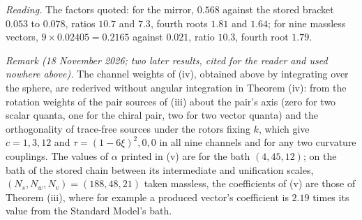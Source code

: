 \emph{Reading.} The factors quoted: for the mirror, $0.568$ against the stored bracket $0.053$ to $0.078$, ratios $10.7$ and $7.3$, fourth roots $1.81$ and $1.64$; for nine massless vectors, $9 \times 0.02405 = 0.2165$ against $0.021$, ratio $10.3$, fourth root $1.79$.

\emph{Remark (18 November 2026; two later results, cited for the reader and used nowhere above).} The channel weights of (iv), obtained above by integrating over the sphere, are rederived without angular integration in Theorem (iv): from the rotation weights of the pair sources of (iii) about the pair's axis (zero for two scalar quanta, one for the chiral pair, two for two vector quanta) and the orthogonality of trace-free sources under the rotors fixing $k$, which give $c = 1, 3, 12$ and $\tau = (1 - 6\xi)^{2}, 0, 0$ in all nine channels and for any two curvature couplings. The values of $\alpha$ printed in (v) are for the bath $(4, 45, 12)$; on the bath of the stored chain between its intermediate and unification scales, $(N_{s}, N_{w}, N_{v}) = (188, 48, 21)$ taken massless, the coefficients of (v) are those of Theorem (iii), where for example a produced vector's coefficient is $2.19$ times its value from the Standard Model's bath.
